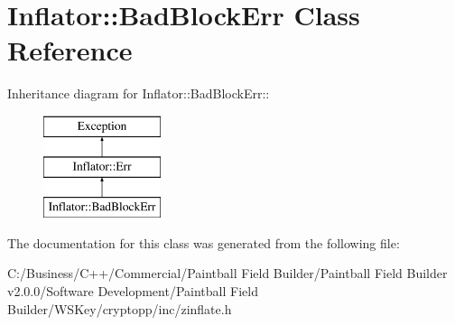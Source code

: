 \hypertarget{class_inflator_1_1_bad_block_err}{
\section{Inflator::BadBlockErr Class Reference}
\label{class_inflator_1_1_bad_block_err}
}
Inheritance diagram for Inflator::BadBlockErr::\begin{figure}[H]
\begin{center}
\leavevmode
\includegraphics[height=3cm]{class_inflator_1_1_bad_block_err}
\end{center}
\end{figure}


The documentation for this class was generated from the following file:\begin{DoxyCompactItemize}
\item 
C:/Business/C++/Commercial/Paintball Field Builder/Paintball Field Builder v2.0.0/Software Development/Paintball Field Builder/WSKey/cryptopp/inc/zinflate.h\end{DoxyCompactItemize}
